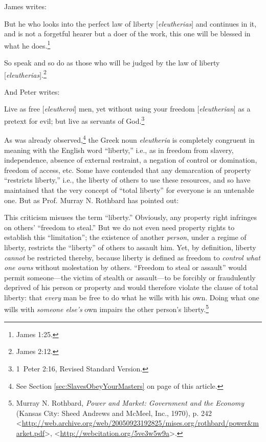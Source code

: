 \documentclass[letterpaper,12pt]{article}
\newenvironment{squote}
  {\small\quote}
  {\endquote\normalsize}
\begin{document}
James writes:

\begin{squote}
But he who looks into the perfect law of liberty [\emph{eleutherias}] and continues in it, and is not a forgetful hearer but a doer of the work, this one will be blessed in what he does.\footnote{James 1:25.}
\end{squote}

\begin{squote}
So speak and so do as those who will be judged by the law of liberty [\emph{eleutherias}].\footnote{James 2:12.}
\end{squote}

And Peter writes:

\begin{squote}
Live as free [\emph{eleutheroi}] men, yet without using your freedom [\emph{eleutherian}] as a pretext for evil; but live as servants of God.\footnote{1~Peter 2:16, Revised Standard Version.}
\end{squote}

As was already observed,\footnote{See Section \ref{sec:SlavesObeyYourMasters} on page \pageref{EleutheriaDefinition} of this article.} the Greek noun \emph{eleutheria} is completely congruent in meaning with the English word ``liberty,'' i.e., as in freedom from slavery, independence, absence of external restraint, a negation of control or domination, freedom of access, etc. Some have contended that any demarcation of property ``restricts liberty,'' i.e., the liberty of others to use these resources, and so have maintained that the very concept of ``total liberty'' for everyone is an untenable one. But as Prof. Murray N. Rothbard has pointed out:

\begin{squote}
This criticism misuses the term ``liberty.'' Obviously, any property right infringes on others' ``freedom to steal.'' But we do not even need property rights to establish this ``limitation''; the existence of another \emph{person}, under a regime of liberty, restricts the ``liberty'' of others to assault him. Yet, by definition, liberty \emph{cannot} be restricted thereby, because liberty is defined as freedom to \emph{control what one owns} without molestation by others. ``Freedom to steal or assault'' would permit someone---the victim of stealth or assault---to be forcibly or fraudulently deprived of his person or property and would therefore violate the clause of total liberty: that \emph{every} man be free to do what he wills with his own. Doing what one wills with \emph{someone else's} own impairs the other person's liberty.\footnote{Murray N. Rothbard, \emph{Power and Market: Government and the Economy} (Kansas City: Sheed Andrews and McMeel, Inc., 1970), p. 242 \textless\url{http://web.archive.org/web/20050923192825/mises.org/rothbard/power&market.pdf}\textgreater , \textless\url{http://webcitation.org/5ve3w5w9a}\textgreater .}
\end{squote}
\end{document}
